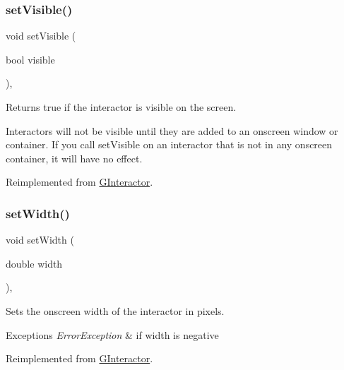 \subsubsection{\texorpdfstring{set\+Visible()}{setVisible()}}
{\footnotesize\ttfamily void set\+Visible (\begin{DoxyParamCaption}\item[{bool}]{visible }\end{DoxyParamCaption})\hspace{0.3cm}{\ttfamily [override]}, {\ttfamily [virtual]}}



Returns true if the interactor is visible on the screen. 

Interactors will not be visible until they are added to an onscreen window or container. If you call set\+Visible on an interactor that is not in any onscreen container, it will have no effect. 

Reimplemented from \mbox{\hyperlink{classsgl_1_1GInteractor_a18e44e30b31525a243960ca3928125aa}{G\+Interactor}}.

\mbox{\label{classsgl_1_1GLabel_af0c5b6fb4e3c3c9a3fabde548efa93db}} 
\subsubsection{\texorpdfstring{set\+Width()}{setWidth()}}
{\footnotesize\ttfamily void set\+Width (\begin{DoxyParamCaption}\item[{double}]{width }\end{DoxyParamCaption})\hspace{0.3cm}{\ttfamily [override]}, {\ttfamily [virtual]}}



Sets the onscreen width of the interactor in pixels. 


\begin{DoxyExceptions}{Exceptions}
{\em Error\+Exception} & if width is negative \\
\hline
\end{DoxyExceptions}


Reimplemented from \mbox{\hyperlink{classsgl_1_1GInteractor_aa3f3fba4cb131baa8696ba01e3bceca1}{G\+Interactor}}.

\mbox{\label{classsgl_1_1GLabel_a8e935ba463ac070ea906118661b15a5f}} 

